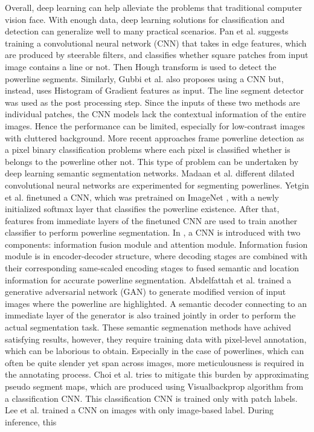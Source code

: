 \documentclass[journal]{IEEEtran}
\begin{document}
Overall, deep learning can help alleviate the problems that traditional computer vision face. With enough data, deep learning solutions for classification and detection can generalize well to many practical scenarios. Pan et al. \cite{related_work_chaofeng_pan_2016} suggests training a convolutional neural network (CNN) that takes in edge features, which are produced by steerable filters, and classifies whether square patches from input image contains a line or not. Then Hough transform is used to detect the powerline segments. Similarly, Gubbi et al. \cite{related_work_jayavardhana_gubbi} also proposes using a CNN but, instead, uses Histogram of Gradient features as input. The line segment detector \cite{lsd} was used as the post processing step. Since the inputs of these two methods are individual patches, the CNN models lack the contextual information of the entire images. Hence the performance can be limited, especially for low-contrast images with cluttered background. More recent approaches \cite{related_work_rainesh_mandaan_2017,related_work_heng_zhang_2019,related_work_yan_li_2019,related_work_omer_emre_yetgin_2018,related_work_rabab_abdelfattah_2022,related_work_rabeea_haffari_2021} frame powerline detection as a pixel binary classification problems where each pixel is classified whether is belongs to the powerline other not. This type of problem can be undertaken by deep learning semantic segmentation networks. Madaan et al. \cite{related_work_rainesh_mandaan_2017} different dilated convolutional neural networks are experimented for segmenting powerlines. Yetgin et al. \cite{related_work_omer_emre_yetgin_2018} finetuned a CNN, which was pretrained on ImageNet \cite{deng2009imagenet}, with a newly initialized softmax layer that classifies the powerline existence. After that, features from immediate layers of the finetuned CNN are used to train another classifier to perform powerline segmentation. In \cite{related_work_yan_li_2019}, a CNN is introduced with two components: information fusion module and attention module. Information fusion module is in encoder-decoder structure, where decoding stages are combined with their corresponding same-scaled encoding stages to fused semantic and location information for accurate powerline segmentation. Abdelfattah et al. \cite{related_work_rabab_abdelfattah_2022} trained a generative adversarial network (GAN) to generate modified version of input images where the powerline are highlighted. A semantic decoder connecting to an immediate layer of the generator is also trained jointly in order to perform the actual segmentation task. These semantic segmenation methods have achived satisfying results, however, they require training data with pixel-level annotation, which can be laborious to obtain. Especially in the case of powerlines, which can often be quite slender yet span across images, more meticulousness is required in the annotating process. Choi et al. \cite{related_work_hyeyeon_choi_2021} tries to mitigate this burden by approximating pseudo segment maps, which are produced using Visualbackprop algorithm \cite{vbp} from a classification CNN. This classification CNN is trained only with patch labels. Lee et al. \cite{related_work_sang_jun_lee_2017} trained a CNN on images with only image-based label. During inference, this 
\end{document}
